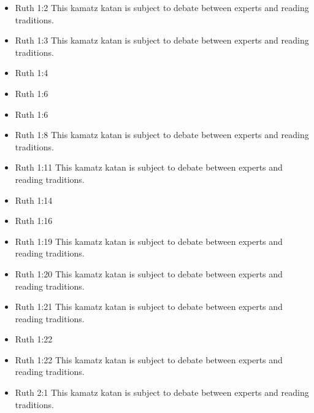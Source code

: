 \documentclass[14pt]{article}
\begin{document}
\begin{multicols}{2}\begin{itemize}
	
	\item Ruth 1:2 This kamatz katan is subject to debate between experts and reading traditions.
	
	\item Ruth 1:3 This kamatz katan is subject to debate between experts and reading traditions.
	
	\item Ruth 1:4
	
	\item Ruth 1:6
	
	\item Ruth 1:6
	
	\item Ruth 1:8 This kamatz katan is subject to debate between experts and reading traditions.
	
	\item Ruth 1:11 This kamatz katan is subject to debate between experts and reading traditions.
	
	\item Ruth 1:14
	
	\item Ruth 1:16
	
	\item Ruth 1:19 This kamatz katan is subject to debate between experts and reading traditions.
	
	\item Ruth 1:20 This kamatz katan is subject to debate between experts and reading traditions.
	
	\item Ruth 1:21 This kamatz katan is subject to debate between experts and reading traditions.
	
	\item Ruth 1:22
	
	\item Ruth 1:22 This kamatz katan is subject to debate between experts and reading traditions.
	
	\item Ruth 2:1 This kamatz katan is subject to debate between experts and reading traditions.
	

\end{itemize}
\end{multicols}
\end{document}
